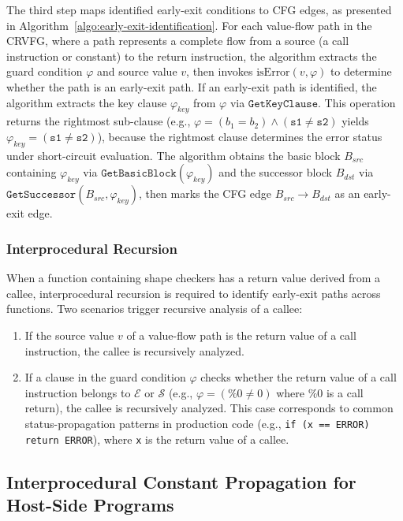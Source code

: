 The third step maps identified early-exit conditions to CFG edges, as presented in Algorithm~\ref{algo:early-exit-identification}.
For each value-flow path in the CRVFG, where a path represents a complete flow from a source (a call instruction or constant) to the return instruction, the algorithm extracts the guard condition $\varphi$ and source value $v$, then invokes $\text{isError}(v,\varphi)$ to determine whether the path is an early-exit path.
If an early-exit path is identified, the algorithm extracts the key clause $\varphi_{key}$ from $\varphi$ via $\texttt{GetKeyClause}$.
This operation returns the rightmost sub-clause (e.g., $\varphi=(b_1=b_2)\land(\texttt{s1}\neq\texttt{s2})$ yields $\varphi_{key}=(\texttt{s1}\neq\texttt{s2})$), because the rightmost clause determines the error status under short-circuit evaluation.
The algorithm obtains the basic block $B_{src}$ containing $\varphi_{key}$ via $\texttt{GetBasicBlock}(\varphi_{key})$ and the successor block $B_{dst}$ via $\texttt{GetSuccessor}(B_{src},\varphi_{key})$, then marks the CFG edge $B_{src}\rightarrow B_{dst}$ as an early-exit edge.

\subsubsection{Interprocedural Recursion}\label{sec:design:inter-procedural-recursion}

When a function containing shape checkers has a return value derived from a callee, interprocedural recursion is required to identify early-exit paths across functions.
Two scenarios trigger recursive analysis of a callee:
\begin{enumerate}
	\item If the source value $v$ of a value-flow path is the return value of a call instruction, the callee is recursively analyzed.
	\item If a clause in the guard condition $\varphi$ checks whether the return value of a call instruction belongs to $\mathcal{E}$ or $\mathcal{S}$ (e.g., $\varphi=(\%0\neq0)$ where $\%0$ is a call return), the callee is recursively analyzed.
	This case corresponds to common status-propagation patterns in production code (e.g., \texttt{if (x == ERROR) return ERROR}), where \texttt{x} is the return value of a callee.
\end{enumerate}

\subsection{Interprocedural Constant Propagation for Host-Side Programs}\label{sec:design:propagation}

